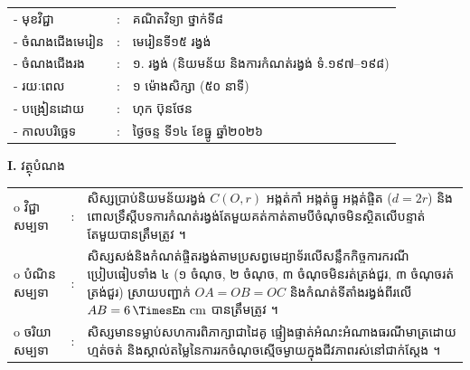 \documentclass[a4paper,10pt]{article}
\newcommand{\wcirc}{{\CourierBullet\fontsize{9.5pt}{11pt}\selectfont o}}
\newcommand{\en}[1]{{\TimesEn #1}}
\newcommand{\unit}[1]{\,\text{\en{#1}}}
\begin{document}
{\renewcommand{\arraystretch}{0.95}
\hspace*{4.05cm}%
\begin{tabular}{@{}l l l@{}}
  - \hspace{0.35cm} មុខវិជ្ជា & : & គណិតវិទ្យា ថ្នាក់ទី៨ \\
  - \hspace{0.35cm} ចំណងជើងមេរៀន & : & មេរៀនទី១៥ រង្វង់ \\
  - \hspace{0.35cm} ចំណងជើងរង & : & ១. រង្វង់ (និយមន័យ និងការកំណត់រង្វង់ ទំ.១៩៧--១៩៨) \\
  - \hspace{0.35cm} រយៈពេល & : & ១ ម៉ោងសិក្សា (៥០ នាទី) \\
  - \hspace{0.35cm} បង្រៀនដោយ & : & ហុក ប៊ុនថែន \\
  - \hspace{0.35cm} កាលបរិច្ឆេទ & : & ថ្ងៃចន្ទ ទី១៤ ខែធ្នូ ឆ្នាំ២០២៦ \\
\end{tabular}

\vspace{1pt}

\textbf{I.} {\muol វត្ថុបំណង}\\[1pt]
\hspace*{0.55cm}%
\begin{tabular}{@{}l l L{14.2cm}@{}}
  \wcirc \hspace{0.25cm} វិជ្ជាសម្បទា & : & សិស្សប្រាប់និយមន័យរង្វង់ $C(O,r)$ អង្កត់កាំ អង្កត់ធ្នូ អង្កត់ផ្ចិត ($d=2r$) និងពោលទ្រឹស្ដីបទការកំណត់រង្វង់តែមួយគត់កាត់តាមបីចំណុចមិនស្ថិតលើបន្ទាត់តែមួយបានត្រឹមត្រូវ ។ \\
  \wcirc \hspace{0.25cm} បំណិនសម្បទា & : & សិស្សសង់និងកំណត់ផ្ចិតរង្វង់តាមប្រសព្វមេដ្យាទ័រលើសន្លឹកកិច្ចការករណីប្រៀបធៀបទាំង ៤ (១ ចំណុច, ២ ចំណុច, ៣ ចំណុចមិនរត់ត្រង់ជួរ, ៣ ចំណុចរត់ត្រង់ជួរ) ស្រាយបញ្ជាក់ $OA=OB=OC$ និងកំណត់ទីតាំងរង្វង់ពីរលើ $AB=6\unit{cm}$ បានត្រឹមត្រូវ ។ \\
  \wcirc \hspace{0.25cm} ចរិយាសម្បទា & : & សិស្សមានទម្លាប់សហការពិភាក្សាជាដៃគូ ផ្ទៀងផ្ទាត់អំណះអំណាងធរណីមាត្រដោយហ្មត់ចត់ និងស្គាល់តម្លៃនៃការរកចំណុចស្មើចម្ងាយក្នុងជីវភាពរស់នៅជាក់ស្ដែង ។ \\
\end{tabular}

\vspace{1pt}

}
\end{document}

